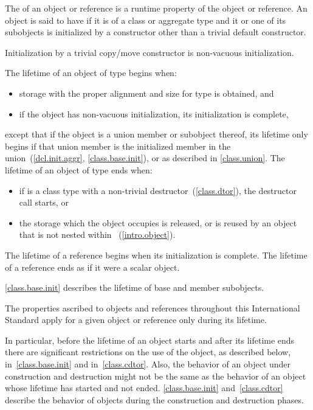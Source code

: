 \pnum
{}%
The  of an object or reference is a runtime property of the
object or reference.
An object is said to have  if it is of a class or
aggregate type and it or one of its subobjects is initialized by a constructor
other than a trivial default constructor. \begin{note} Initialization by a
trivial copy/move constructor is non-vacuous initialization. \end{note}
The lifetime of an object of type  begins when:
\begin{itemize}
\item storage with the proper alignment and size for type  is
obtained, and
\item if the object has non-vacuous initialization, its initialization is complete,
\end{itemize}
except that if the object is a union member or subobject thereof,
its lifetime only begins if that union member is the
initialized member in the union~(\ref{dcl.init.aggr}, \ref{class.base.init}),
or as described in \ref{class.union}.
The lifetime of an object  of type  ends when:
\begin{itemize}
\item if  is a class type with a non-trivial
destructor~(\ref{class.dtor}), the destructor call starts, or
\item the storage which the object occupies is released,
or is reused by an object that is not nested within ~(\ref{intro.object}).
\end{itemize}

\pnum
The lifetime of a reference begins when its initialization is complete.
The lifetime of a reference ends as if it were a scalar object.

\pnum
\begin{note} \ref{class.base.init}
describes the lifetime of base and member subobjects. \end{note}

\pnum
The properties ascribed to objects and references throughout this International
Standard apply for a given object or reference only during its lifetime. \begin{note}
In particular, before the lifetime of an object starts and after its
lifetime ends there are significant restrictions on the use of the
object, as described below, in~\ref{class.base.init} and
in~\ref{class.cdtor}. Also, the behavior of an object under construction
and destruction might not be the same as the behavior of an object whose
lifetime has started and not ended. \ref{class.base.init}
and~\ref{class.cdtor} describe the behavior of objects during the
construction and destruction phases. \end{note}

